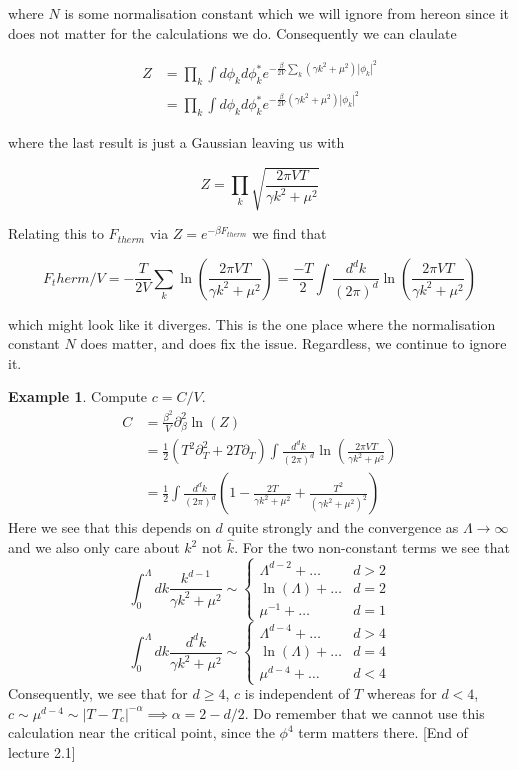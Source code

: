 \documentclass{article}
\theoremstyle{definition}
\newtheorem{example}{Example}
\begin{document}
where $N$ is some normalisation constant which we will ignore from hereon since
it does not matter for the calculations we do. Consequently we can claulate

\begin{align*}
  Z &= \prod_k \int  d\phi_k d\phi_k^* e^{-\frac{\beta}{2V} \sum_k (\gamma k^2 + \mu^2) |\phi_k|^2} \\
    &= \prod_k \int d\phi_k d\phi_k^* e^{-\frac{\beta}{2V} (\gamma k^2 + \mu^2) |\phi_k|^2}
\end{align*}

where the last result is just a Gaussian leaving us with

$$ Z = \prod_k \sqrt{\frac{2\pi V T}{\gamma k^2 + \mu^2}} $$

Relating this to $F_{therm}$ via $Z = e^{-\beta F_{therm}}$ we find that

$$ F_therm / V = - \frac{T}{2V} \sum_k \ln \left( \frac{2\pi V T}{\gamma k^2 +
    \mu^2} \right) = \frac{-T}{2} \int \frac{d^dk}{(2\pi)^d} \ln \left(
  \frac{2\pi V T}{\gamma k^2 + \mu^2} \right) $$

which might look like it diverges. This is the one place where the normalisation
constant $N$ does matter, and does fix the issue. Regardless, we continue to
ignore it.

\begin{example}
  Compute $c = C/V$.
  \begin{align*}
    C &= \frac{\beta^2}{V} \partial_\beta^2 \ln(Z) \\
      &= \frac{1}{2} (T^2 \partial_T^2 + 2T \partial_T) \int \frac{d^d k}{(2\pi)^d} \ln \left( \frac{2 \pi V T}{\gamma k^2 + \mu^2} \right) \\
      &= \frac{1}{2} \int \frac{d^d k}{(2\pi)^d} (1 - \frac{2T}{\gamma k^2 + \mu^2} + \frac{T^2}{(\gamma k^2 + \mu^2)^2 })
  \end{align*}
  Here we see that this depends on $d$ quite strongly and the convergence as
  $\Lambda \to \infty$ and we also only care about $k^2$ not $\hat{k}$.
  For the two non-constant terms we see that
  $$
  \int^\Lambda_0 dk \frac{k^{d - 1}}{\gamma k^2 + \mu^2} \sim
  \begin{cases}
    \Lambda^{d - 2} + \dots & d > 2 \\
    \ln(\Lambda) + \dots & d = 2 \\
    \mu^{-1} + \dots & d = 1
  \end{cases}
  $$
  $$
  \int^\Lambda_0 dk \frac{d^d k}{\gamma k^2 + \mu^2} \sim
  \begin{cases}
    \Lambda^{d - 4} + \dots & d > 4 \\
    \ln(\Lambda) + \dots & d = 4 \\
    \mu^{d - 4} + \dots & d < 4
  \end{cases}
  $$
  Consequently, we see that for $d \geq 4$, $c$ is independent of $T$ whereas
  for $d < 4$, $c \sim \mu^{d - 4} \sim |T - T_c|^{-\alpha} \implies \alpha = 2
  - d / 2$. Do remember that we cannot use this calculation near the critical
  point, since the $\phi^4$ term matters there. [End of lecture 2.1]
\end{example}
\end{document}
